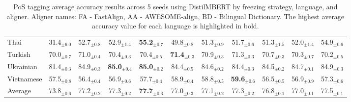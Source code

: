 \begin{table*}[ht]
{\begin{tabular}{lcccccccccc}
Thai & 31.4$_{\pm 6.0}$ & 52.7$_{\pm 0.8}$ & 52.9$_{\pm 1.4}$ & \textbf{55.2}$_{\pm 0.7}$ & 49.8$_{\pm 0.8}$ & 51.3$_{\pm 0.9}$ & 51.7$_{\pm 0.6}$ & 51.3$_{\pm 1.5}$ & 52.0$_{\pm 1.4}$ & 54.9$_{\pm 0.6}$ \\
Turkish & 70.0$_{\pm 0.7}$ & 71.0$_{\pm 0.4}$ & 70.4$_{\pm 0.3}$ & 70.4$_{\pm 0.5}$ & \textbf{71.4}$_{\pm 0.3}$ & 70.9$_{\pm 0.3}$ & 71.3$_{\pm 0.3}$ & 70.7$_{\pm 0.3}$ & 70.3$_{\pm 0.7}$ & 70.2$_{\pm 0.5}$ \\
Ukrainian & 81.4$_{\pm 0.3}$ & 84.9$_{\pm 0.3}$ & \textbf{85.0}$_{\pm 0.4}$ & \textbf{85.0}$_{\pm 0.2}$ & 84.4$_{\pm 0.5}$ & 84.6$_{\pm 0.2}$ & 84.4$_{\pm 0.3}$ & 84.5$_{\pm 0.2}$ & 84.7$_{\pm 0.1}$ & 84.9$_{\pm 0.3}$ \\
Vietnamese & 57.5$_{\pm 0.8}$ & 56.4$_{\pm 0.4}$ & 56.9$_{\pm 0.6}$ & 57.7$_{\pm 0.4}$ & 58.9$_{\pm 0.4}$ & 58.8$_{\pm 0.5}$ & \textbf{59.6}$_{\pm 0.6}$ & 56.5$_{\pm 0.5}$ & 56.9$_{\pm 0.9}$ & 57.3$_{\pm 0.6}$ \\
\hline
Average & 73.8$_{\pm 0.6}$ & 77.2$_{\pm 0.2}$ & 77.3$_{\pm 0.2}$ & \textbf{77.7}$_{\pm 0.3}$ & 77.0$_{\pm 0.3}$ & 77.1$_{\pm 0.2}$ & 77.3$_{\pm 0.2}$ & 76.8$_{\pm 0.1}$ & 77.0$_{\pm 0.1}$ & 77.5$_{\pm 0.1}$ \\

        \bottomrule
        \end{tabular}
        }
        \caption{PoS tagging average accuracy results across 5 seeds using DistilMBERT by freezing strategy, language, and aligner. Aligner names: FA - FastAlign, AA - AWESOME-align, BD - Bilingual Dictionary. The highest average accuracy value for each language is highlighted in bold.}
        \label{table:results_distilMBERT_PoS-tagging_before}
        \end{table*}
        